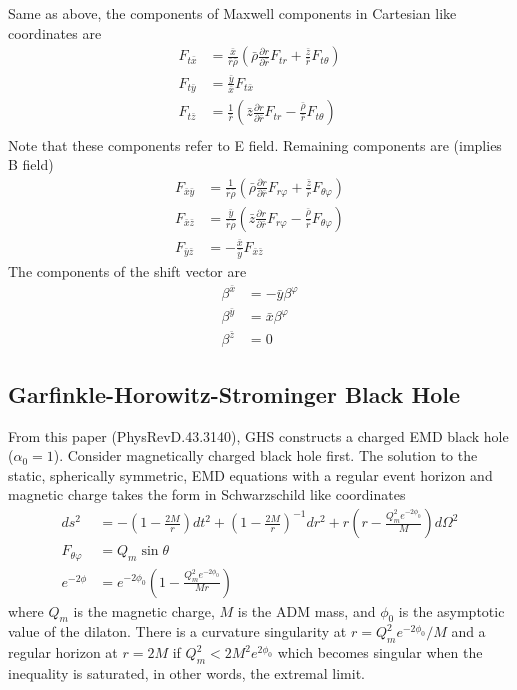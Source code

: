 \documentclass[prd]{revtex4}
\begin{document}
Same as above, the components of Maxwell components in Cartesian like coordinates are
\begin{align}
F_{t \bar{x}} &= \frac{ \bar{x} }{\bar{r} \bar{\rho}} \left(\bar{\rho} \frac{\partial r}{\partial \bar{r}} F_{t r} + \frac{\bar{z}}{\bar{r}} F_{t \theta} \right) \\
F_{t \bar{y}} &= \frac{\bar{y}}{\bar{x}} F_{t \bar{x}}\\
F_{t \bar{z}} &= \frac{1}{\bar{r}} \left(\bar{z} \frac{\partial r}{\partial \bar{r}} F_{t r} - \frac{\bar{\rho}}{\bar{r}} F_{t \theta} \right) \\
\end{align}
Note that these components refer to E field. Remaining components are (implies B field)
\begin{align}
F_{\bar{x} \bar{y}} &= \frac{1}{\bar{r} \bar{\rho}} \left(\bar{\rho} \frac{\partial r}{\partial \bar{r}} F_{r \varphi} + \frac{\bar{z}}{\bar{r}} F_{\theta \varphi} \right) \\
F_{\bar{x} \bar{z}} &= \frac{\bar{y}}{\bar{r} \bar{\rho}} \left(\bar{z} \frac{\partial r}{\partial \bar{r}} F_{r \varphi} - \frac{\bar{\rho}}{\bar{r}} F_{\theta \varphi} \right) \\
F_{\bar{y} \bar{z}} &= -\frac{\bar{x}}{\bar{y}} F_{\bar{x} \bar{z}}
\end{align}
The components of the shift vector are
\begin{align}
\beta^{\bar{x}} &= - \bar{y} \beta^{\varphi} \\
\beta^{\bar{y} }&= \bar{x} \beta^{\varphi} \\
\beta^{\bar{z}} &= 0
\end{align}



\subsection{Garfinkle-Horowitz-Strominger Black Hole}

From this paper (PhysRevD.43.3140), GHS constructs a charged EMD black hole ($\alpha_0 =1$). Consider magnetically charged black hole first. The solution to the static, spherically symmetric, EMD equations with a regular event horizon and magnetic charge takes the form in Schwarzschild like coordinates
\begin{align}
ds^2 &= - \left( 1-\frac{2M}{r} \right) dt^2 + \left(1-\frac{2M}{r} \right)^{-1} dr^2 + r \left(r - \frac{Q_m^2 e^{-2 \phi_0}}{M} \right) d\Omega^2 \\
F_{\theta \varphi} &= Q_m \sin \theta \\
e^{-2 \phi} &= e^{-2 \phi_0} \left(1 - \frac{Q_m^2 e^{-2 \phi_0}}{M r} \right)
\end{align}
where $Q_m$ is the magnetic charge, $M$ is the ADM mass, and $\phi_0$ is the asymptotic value of the dilaton. There is a curvature singularity at $r=Q^2_m e^{-2 \phi_0} /M$ and a regular horizon at $r=2M$ if $Q^2_m < 2 M^2 e^{2\phi_0}$ which becomes singular when the inequality is saturated, in other words, the extremal limit.
\end{document}
